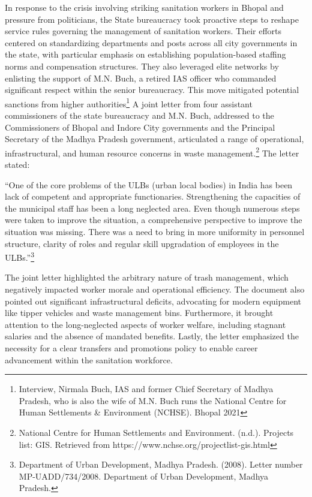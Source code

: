 In response to the crisis involving striking sanitation workers in Bhopal and pressure from politicians, the State bureaucracy took proactive steps to reshape service rules governing the management of sanitation workers. Their efforts centered on standardizing departments and posts across all city governments in the state, with particular emphasis on establishing population-based staffing norms and compensation structures. They also leveraged elite networks by enlisting the support of M.N. Buch, a retired IAS officer who commanded significant respect within the senior bureaucracy. This move mitigated potential sanctions from higher authorities\footnote{Interview, Nirmala Buch, IAS and former Chief Secretary of Madhya Pradesh, who is also the wife of M.N. Buch runs the National Centre for Human Settlements \& Environment (NCHSE). Bhopal 2021} A joint letter from four assistant commissioners of the state bureaucracy and M.N. Buch, addressed to the Commissioners of Bhopal and Indore City governments and the Principal Secretary of the Madhya Pradesh government, articulated a range of operational, infrastructural, and human resource concerns in waste management.\footnote{National Centre for Human Settlements and Environment. (n.d.). Projects list: GIS. Retrieved from https://www.nchse.org/projectlist-gis.html} The letter stated:

``One of the core problems of the ULBs (urban local bodies) in India has been lack of competent and appropriate functionaries. Strengthening the capacities of the municipal staff has been a long neglected area. Even though numerous steps were taken to improve the situation, a comprehensive perspective to improve the situation was missing. There was a need to bring in more uniformity in personnel structure, clarity of roles and regular skill upgradation of employees in the ULBs.''\footnote{Department of Urban Development, Madhya Pradesh. (2008). Letter number MP-UADD/734/2008. Department of Urban Development, Madhya Pradesh.}

The joint letter highlighted the arbitrary nature of trash management, which negatively impacted worker morale and operational efficiency. The document also pointed out significant infrastructural deficits, advocating for modern equipment like tipper vehicles and waste management bins. Furthermore, it brought attention to the long-neglected aspects of worker welfare, including stagnant salaries and the absence of mandated benefits. Lastly, the letter emphasized the necessity for a clear transfers and promotions policy to enable career advancement within the sanitation workforce.

